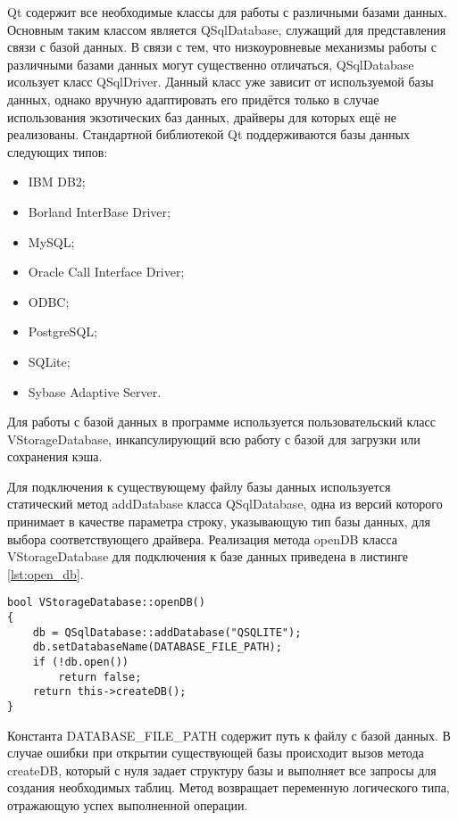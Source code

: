 Qt содержит все необходимые классы для работы с различными базами данных.
Основным таким классом является QSqlDatabase, служащий для представления связи с
базой данных. В связи с тем, что низкоуровневые механизмы работы с различными
базами данных могут существенно отличаться, QSqlDatabase исользует класс
QSqlDriver. Данный класс уже зависит от используемой базы данных, однако вручную
адаптировать его придётся только в случае использования экзотических баз данных,
драйверы для которых ещё не реализованы. Стандартной библиотекой
Qt поддерживаются базы данных следующих типов:
\begin{itemize}
  \item IBM DB2;
  \item Borland InterBase Driver;
  \item MySQL;
  \item Oracle Call Interface Driver;
  \item ODBC;
  \item PostgreSQL;
  \item SQLite;
  \item Sybase Adaptive Server.
\end{itemize}

Для работы с базой данных в программе используется пользовательский класс
VStorageDatabase, инкапсулирующий всю работу с базой для загрузки или сохранения кэша.

Для подключения к существующему файлу базы данных используется статический метод
addDatabase класса QSqlDatabase, одна из версий которого принимает в качестве
параметра строку, указывающую тип базы данных, для выбора соответствующего
драйвера. Реализация метода openDB класса VStorageDatabase для подключения к
базе данных приведена в листинге \ref{lst:open_db}.

\begin{lstlisting}[style = cstyle, 
				   caption = {Реализация метода openDB},
				   label = lst:open_db] 
bool VStorageDatabase::openDB()
{
	db = QSqlDatabase::addDatabase("QSQLITE");
	db.setDatabaseName(DATABASE_FILE_PATH);
	if (!db.open())
		return false;
	return this->createDB();
}
\end{lstlisting}

Константа DATABASE\_FILE\_PATH содержит путь к файлу с базой данных. В случае
ошибки при открытии существующей базы происходит вызов метода createDB, который
с нуля задает структуру базы и выполняет все запросы для создания необходимых
таблиц. Метод возвращает переменную логического типа, отражающую успех
выполненной операции.

